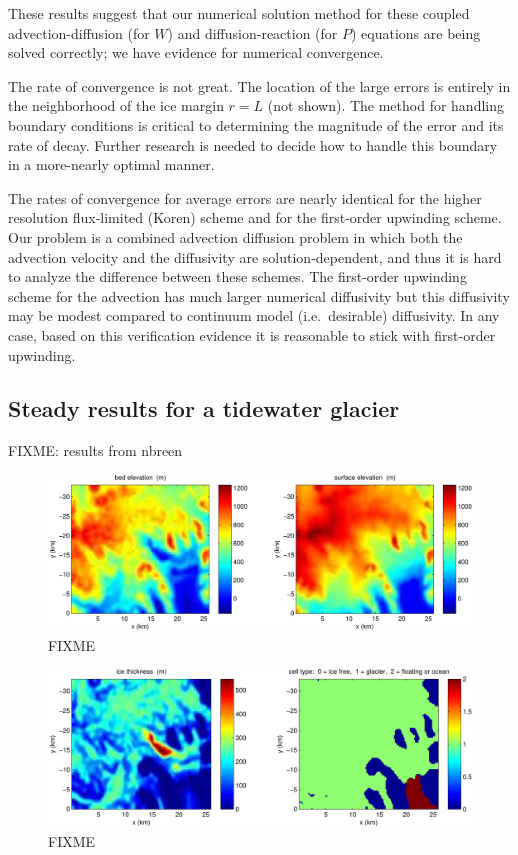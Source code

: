 \documentclass[11pt,final]{amsart}%
\begin{document}
These results suggest that our numerical solution method for these coupled advection-diffusion (for $W$) and diffusion-reaction (for $P$) equations are being solved correctly; we have evidence for numerical convergence.

The rate of convergence is not great.  The location of the large errors is entirely in the neighborhood of the ice margin $r=L$ (not shown).  The method for handling boundary conditions is critical to determining the magnitude of the error and its rate of decay.  Further research is needed to decide how to handle this boundary in a more-nearly optimal manner.

The rates of convergence for average errors are nearly identical for the higher resolution flux-limited (Koren) scheme and for the first-order upwinding scheme.  Our problem is a combined advection diffusion problem in which both the advection velocity and the diffusivity are solution-dependent, and thus it is hard to analyze the difference between these schemes.  The first-order upwinding scheme for the advection has much larger numerical diffusivity but this diffusivity may be modest compared to continuum model (i.e.~desirable) diffusivity.  In any case, based on this verification evidence it is reasonable to stick with first-order upwinding.

\subsection*{Steady results for a tidewater glacier}

FIXME: results from nbreen

\begin{figure}[ht]
\includegraphics[width=7.0in,keepaspectratio=true]{figs/bed-surf-250m}
\caption{FIXME}
\end{figure}

\begin{figure}[ht]
\includegraphics[width=7.0in,keepaspectratio=true]{figs/icethk-icefree-float-250m}
\caption{FIXME}
\end{figure}
\end{document}

